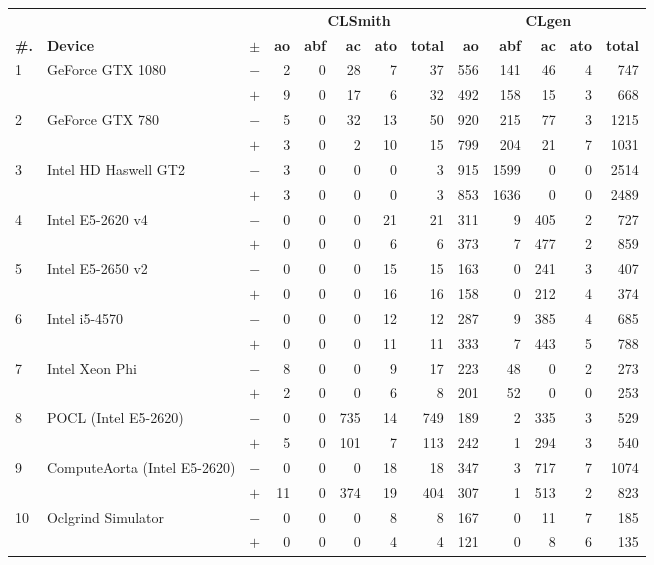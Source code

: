 \begin{tabular}{lll | rrrrr | rrrrr }
  \toprule
  & & & \multicolumn{5}{c|}{\textbf{CLSmith}} & \multicolumn{5}{c}{\textbf{CLgen}} \\
  \textbf{\#.} & \textbf{Device} & $\pm$ &
  \textbf{ao} & \textbf{abf} & \textbf{ac} & \textbf{ato} & \textbf{total} &
  \textbf{ao} & \textbf{abf} & \textbf{ac} & \textbf{ato} & \textbf{total} \\
  \midrule
  \multirow{ 2}{*}{1} & \multirow{ 2}{*}{GeForce GTX 1080} & $-$ & 2 & 0 & 28 & 7 & 37       & 556 & 141 & 46 & 4 & 747 \\& & $+$ & 9 & 0 & 17 & 6 & 32 & 492 & 158 & 15 & 3 & 668 \\
\hline
\multirow{ 2}{*}{2} & \multirow{ 2}{*}{GeForce GTX 780} & $-$ & 5 & 0 & 32 & 13 & 50       & 920 & 215 & 77 & 3 & 1215 \\& & $+$ & 3 & 0 & 2 & 10 & 15 & 799 & 204 & 21 & 7 & 1031 \\
\hline
\multirow{ 2}{*}{3} & \multirow{ 2}{*}{Intel HD Haswell GT2} & $-$ & 3 & 0 & 0 & 0 & 3       & 915 & 1599 & 0 & 0 & 2514 \\& & $+$ & 3 & 0 & 0 & 0 & 3 & 853 & 1636 & 0 & 0 & 2489 \\
\hline
\multirow{ 2}{*}{4} & \multirow{ 2}{*}{Intel E5-2620 v4} & $-$ & 0 & 0 & 0 & 21 & 21       & 311 & 9 & 405 & 2 & 727 \\& & $+$ & 0 & 0 & 0 & 6 & 6 & 373 & 7 & 477 & 2 & 859 \\
\hline
\multirow{ 2}{*}{5} & \multirow{ 2}{*}{Intel E5-2650 v2} & $-$ & 0 & 0 & 0 & 15 & 15       & 163 & 0 & 241 & 3 & 407 \\& & $+$ & 0 & 0 & 0 & 16 & 16 & 158 & 0 & 212 & 4 & 374 \\
\hline
\multirow{ 2}{*}{6} & \multirow{ 2}{*}{Intel i5-4570} & $-$ & 0 & 0 & 0 & 12 & 12       & 287 & 9 & 385 & 4 & 685 \\& & $+$ & 0 & 0 & 0 & 11 & 11 & 333 & 7 & 443 & 5 & 788 \\
\hline
\multirow{ 2}{*}{7} & \multirow{ 2}{*}{Intel Xeon Phi} & $-$ & 8 & 0 & 0 & 9 & 17       & 223 & 48 & 0 & 2 & 273 \\& & $+$ & 2 & 0 & 0 & 6 & 8 & 201 & 52 & 0 & 0 & 253 \\
\hline
\multirow{ 2}{*}{8} & \multirow{ 2}{*}{POCL (Intel E5-2620)} & $-$ & 0 & 0 & 735 & 14 & 749       & 189 & 2 & 335 & 3 & 529 \\& & $+$ & 5 & 0 & 101 & 7 & 113 & 242 & 1 & 294 & 3 & 540 \\
\hline
\multirow{ 2}{*}{9} & \multirow{ 2}{*}{ComputeAorta (Intel E5-2620)} & $-$ & 0 & 0 & 0 & 18 & 18       & 347 & 3 & 717 & 7 & 1074 \\& & $+$ & 11 & 0 & 374 & 19 & 404 & 307 & 1 & 513 & 2 & 823 \\
\hline
\multirow{ 2}{*}{10} & \multirow{ 2}{*}{Oclgrind Simulator} & $-$ & 0 & 0 & 0 & 8 & 8       & 167 & 0 & 11 & 7 & 185 \\& & $+$ & 0 & 0 & 0 & 4 & 4 & 121 & 0 & 8 & 6 & 135 \\
  \bottomrule
\end{tabular}

